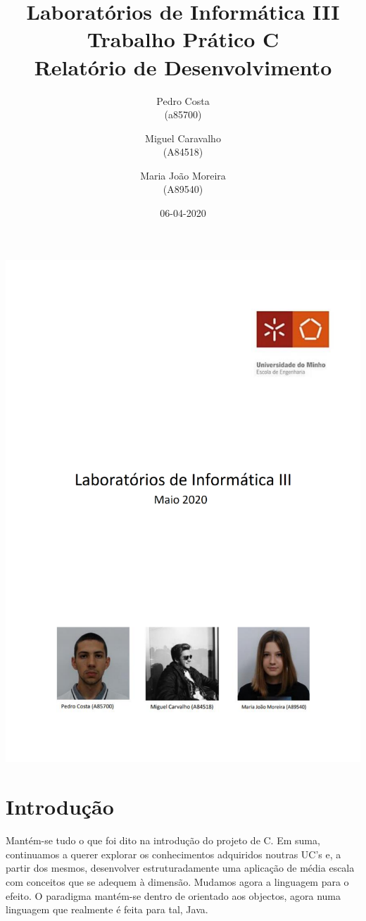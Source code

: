 \documentclass[11pt]{article}
\title{Laboratórios de Informática III \\
       \textbf{Trabalho Prático C}\\ Relatório de Desenvolvimento
       } %
\author{Pedro Costa\\ (a85700) \and Miguel Caravalho\\ (A84518)
         \and Maria João Moreira\\ (A89540)
       } %
\date{06-04-2020} %
\begin{document}
\begin{titlepage}
    \includegraphics[width=\columnwidth]{images/capa.pdf}
\end{titlepage}
\newpage

\newpage
\tableofcontents %

\newpage
\section{Introdução}
Mantém-se tudo o que foi dito na introdução do projeto de C. Em suma, continuamos a querer explorar os conhecimentos adquiridos noutras UC's e, a partir dos mesmos, desenvolver estruturadamente uma aplicação de média escala com conceitos que se adequem à dimensão. Mudamos agora a linguagem para o efeito. O paradigma mantém-se dentro de orientado aos objectos, agora numa linguagem que realmente é feita para tal, Java. 
\end{document}
